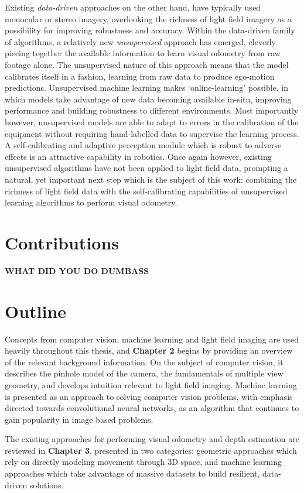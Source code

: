 Existing \textit{data-driven} approaches on the other hand, have typically used monocular or stereo imagery, overlooking the richness of light field imagery as a possibility for improving robustness and accuracy. Within the data-driven family of algorithms, a relatively new \textit{unsupervised} approach has emerged, cleverly piecing together the available information to learn visual odometry from raw footage alone. The unsupervised nature of this approach means that the model calibrates itself in a fashion, learning from raw data to produce ego-motion predictions. Unsupervised machine learning makes `online-learning' possible, in which models take advantage of new data becoming available in-situ, improving performance and building robustness to different environments. Most importantly however, unsupervised models are able to adapt to errors in the calibration of the equipment without requiring hand-labelled data to supervise the learning process. A self-calibrating and adaptive perception module which is robust to adverse effects is an attractive capability in robotics. Once again however, existing unsupervised algorithms have not been applied to light field data, prompting a natural, yet important next step which is the subject of this work: combining the richness of light field data with the self-calibrating capabilities of unsupervised learning algorithms to perform visual odometry.



\section{Contributions}
\textbf{WHAT DID YOU DO DUMBASS}

\section{Outline}
Concepts from computer vision, machine learning and light field imaging are used heavily throughout this thesis, and \textbf{Chapter 2} begins by providing an overview of the relevant background information. On the subject of computer vision, it describes the pinhole model of the camera, the fundamentals of multiple view geometry, and develops intuition relevant to light field imaging. Machine learning is presented as an approach to solving computer vision problems, with emphasis directed towards convolutional neural networks, as an algorithm that continues to gain popularity in image based problems.

The existing approaches for performing visual odometry and depth estimation are reviewed in \textbf{Chapter 3}, presented in two categories: geometric approaches which rely on directly modeling movement through 3D space, and machine learning approaches which take advantage of massive datasets to build resilient, data-driven solutions.

